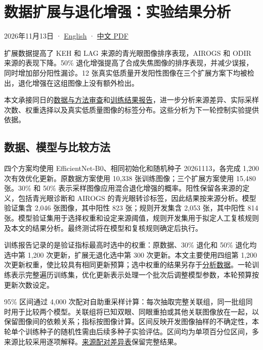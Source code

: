 \documentclass[
  10pt,
]{article}
\author{}
\date{}
\begin{document}
\section{数据扩展与退化增强：实验结果分析}\label{ux6570ux636eux6269ux5c55ux4e0eux9000ux5316ux589eux5f3aux5b9eux9a8cux7ed3ux679cux5206ux6790}

2026年11月13日 · \href{experimental-analysis.en.md}{English} ·
\href{experimental-analysis.zh.pdf}{中文 PDF}

扩展数据提高了 KEH 和 LAG 来源的青光眼图像排序表现，AIROGS 和 ODIR
来源的表现下降。50\%
退化增强提高了合成失焦图像的排序表现，并减少误报，同时增加部分阳性漏诊。12
张真实低质量开发阳性图像在三个扩展方案下均被检出，退化增强在这组图像上没有额外检出。

本文承接同日的\href{../data-review/data-and-degradation-review.zh.md}{数据与方法审查}和\href{../training-results/training-results.zh.md}{训练结果报告}，进一步分析来源差异、实际采样次数、权重选择以及真实低质量图像的标签分布。这些分析为下一轮控制实验提供依据。

\subsection{数据、模型与比较方法}\label{ux6570ux636eux6a21ux578bux4e0eux6bd4ux8f83ux65b9ux6cd5}

四个方案均使用 EfficientNet-B0、相同初始化和随机种子 20261113，各完成
1,200 次有效优化更新。原数据方案使用 10,338 张训练图像；三个扩展方案使用
15,480 张。30\% 和 50\%
表示采样图像应用混合退化增强的概率。阳性保留各来源的定义，包括青光眼诊断和
AIROGS 的青光眼转诊标签，因此结果按来源分析。模型验证集含 2,046
张图像，其中阳性 823 张；规则开发集含 2,053 张，其中阳性 814
张。模型验证集用于选择权重和设定来源阈值，规则开发集用于拟定人工复核规则及本文的结果分析。最终测试将在模型和复核规则确定后执行。

训练报告记录的是验证指标最高时选中的权重：原数据、30\% 退化和 50\%
退化均选中第 1,200 次更新，扩展无退化选中第 300
次更新。本文主要使用四组第 1,200
次更新权重，使比较具有相同更新预算；选中权重的结果另存于\href{analysis.json}{分析数据}。一轮训练表示完整遍历训练集，优化更新表示处理一个批次后调整模型参数，本轮预算按更新次数设定。

95\% 区间通过 4,000
次配对自助重采样计算：每次抽取完整关联组，同一批组同时用于比较两个模型。关联组将已知双眼、同眼重拍或其他关联图像放在一起，以保留图像间的依赖关系；指标按图像计算。区间反映开发图像抽样的不确定性，本轮单个训练种子的随机性需由后续多种子实验评估。区间均为单项百分位区间，多来源比较采用逐项解释。\href{paired-source-contrasts.csv}{来源配对差异表}保留完整结果。
\end{document}
